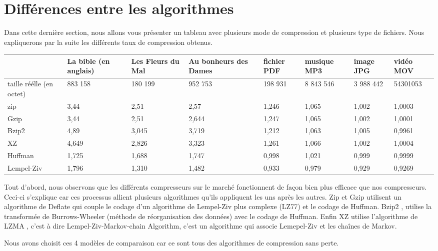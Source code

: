 \documentclass{report}
\begin{document}
\newpage
\section*{Différences entre les algorithmes}
Dans cette dernière section, nous allons vous présenter un tableau avec plusieurs mode de compression et plusieurs type de fichiers. 
Nous expliquerons par la suite les différents taux de compression obtenus. 


\begin{flushleft}
{\renewcommand{\arraystretch}{2}
\begin{tabular}{|p{1.5cm}|p{1.5cm}|p{1.5cm}|p{1.5cm}|p{1.5cm}|p{1.5cm}|p{1.5cm}|p{1.5cm}|}
\hline
 & La bible (en anglais)  & Les Fleurs du Mal  & Au bonheurs des Dames & fichier PDF & musique  MP3 & image JPG & vidéo MOV\\
\hline
taille réélle (en octet)  & 883 158 & 180 199 & 952 753 & 198 931 & 8 843 546 & 3 988 442 & 54301053 \\\hline
zip & 3,44 & 2,51 & 2,57 & 1,246 & 1,065 & 1,002 & 1,0003 \\
\hline
Gzip & 3,44 & 2,51 & 2,644 & 1,247 & 1,065 & 1,002 & 1,0001 \\
\hline
Bzip2 & 4,89 & 3,045 & 3,719 & 1,212 & 1,063 & 1,005 & 0,9961\\
\hline
XZ & 4,649 & 2,826 & 3,323 & 1,261 & 1,066 & 1,002 & 1,0004\\
\hline
Huffman & 1,725 & 1,688 & 1,747 & 0,998 & 1,021 & 0,999 & 0,9999 \\
\hline
Lempel-Ziv & 1,796 & 1,310 & 1,482 & 0,933 & 0,979 & 0,929 & 0,9269\\
\hline

\end{tabular}
}
\end{flushleft}

Tout d'abord, nous observons que les différents compresseurs sur le marché fonctionnent de façon bien plus efficace que nos compresseurs. Ceci-ci s'explique car ces processus allient plusieurs algorithmes qu'ils appliquent les uns après les autres. Zip et Gzip utilisent un algorithme de Deflate qui couple le codage d'un algorithme de Lempel-Ziv plus complexe (LZ77) et le codage de Huffman. Bzip2 , utilise  la transformée de Burrows-Wheeler (méthode de réorganisation des données) avec le codage de Huffman. Enfin XZ utilise l'algorithme de LZMA , c'est à dire Lempel-Ziv-Markov-chain Algorithm, c'est un algorithme qui associe Lemepel-Ziv et les chaînes de Markov.

Nous avons choisit ces 4 modèles de comparaison car ce sont tous des algorithmes de compression sans perte. 
\end{document}
